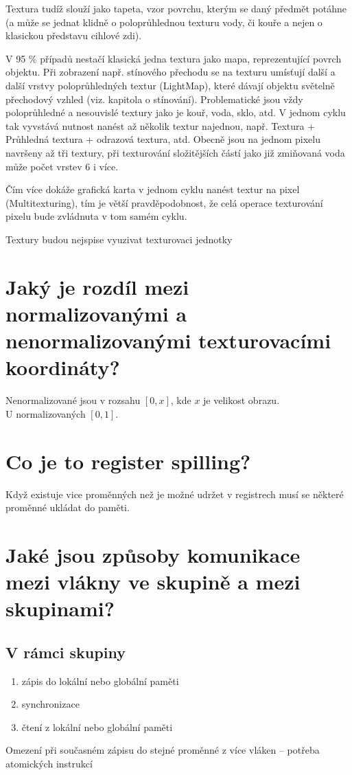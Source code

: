 	Textura tudíž slouží jako tapeta, vzor povrchu, kterým se daný předmět potáhne (a může se jednat klidně o poloprůhlednou texturu vody, či kouře a nejen o klasickou představu cihlové zdi).
	
	V 95 \% případů nestačí klasická jedna textura jako mapa, reprezentující povrch objektu. Při zobrazení např. stínového přechodu se na texturu umísťují další a další vrstvy poloprůhledných textur (LightMap), které dávají objektu světelně přechodový vzhled (viz. kapitola o stínování). Problematické jsou vždy poloprůhledné a nesouvislé textury jako je kouř, voda, sklo, atd. V jednom cyklu tak vyvstává nutnost nanést až několik textur najednou, např. Textura + Průhledná textura + odrazová textura, atd. Obecně jsou na jednom pixelu navršeny až tři textury, při texturování složitějších částí jako již zmiňovaná voda může počet vrstev 6 i více.
	
	Čím více dokáže grafická karta v jednom cyklu nanést textur na pixel (Multitexturing), tím je větší pravděpodobnost, že celá operace texturování pixelu bude zvládnuta v tom samém cyklu.


	Textury budou nejspise vyuzivat texturovaci jednotky
	

\section{Jaký je rozdíl mezi normalizovanými a nenormalizovanými texturovacími koordináty?}
	Nenormalizované jsou v rozsahu $[0, x]$, kde $x$ je velikost obrazu.  \\
	U normalizovaných $[0, 1]$.


\section{Co je to register spilling?}
	Když existuje vice proměnných než je možné udržet v registrech musí se některé proměnné ukládat do paměti.


\section{Jaké jsou způsoby komunikace mezi vlákny ve skupině a mezi skupinami?}
	\subsection*{V rámci skupiny}
	\begin{enumerate}
		\setlength\itemsep{0em}
		\item zápis do lokální nebo globální paměti
		\item synchronizace
		\item čtení z lokální nebo globální paměti
	\end{enumerate}
	Omezení při současném zápisu do stejné proměnné z více vláken -- potřeba atomických instrukcí
	
